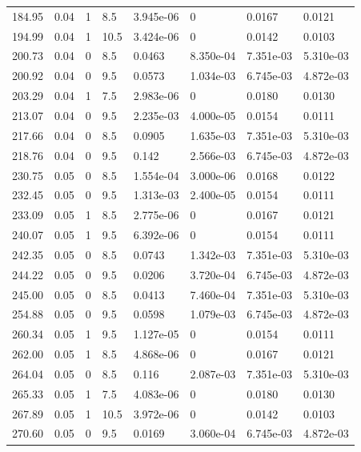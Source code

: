 \documentclass[preview]{standalone}
\begin{document}
{{{\begin{tabular}{L{1.2cm}C{1.2cm} C{0.3cm}C{0.5cm} C{1.4cm}C{1.4cm} C{1.4cm}C{1.4cm}}
  184.95  &  0.04  & 1     & 8.5 &  3.945e-06  & 0  & 0.0167 &  0.0121   \\ 
  194.99  &  0.04  & 1     & 10.5 &  3.424e-06  & 0  & 0.0142 &  0.0103   \\ 
  200.73  &  0.04  & 0     & 8.5 &  0.0463  & 8.350e-04  & 7.351e-03 &  5.310e-03   \\ 
  200.92  &  0.04  & 0     & 9.5 &  0.0573  & 1.034e-03  & 6.745e-03 &  4.872e-03   \\ 
  203.29  &  0.04  & 1     & 7.5 &  2.983e-06  & 0  & 0.0180 &  0.0130   \\ 
  213.07  &  0.04  & 0     & 9.5 &  2.235e-03  & 4.000e-05  & 0.0154 &  0.0111   \\ 
  217.66  &  0.04  & 0     & 8.5 &  0.0905  & 1.635e-03  & 7.351e-03 &  5.310e-03   \\ 
  218.76  &  0.04  & 0     & 9.5 &  0.142  & 2.566e-03  & 6.745e-03 &  4.872e-03   \\ 
  230.75  &  0.05  & 0     & 8.5 &  1.554e-04  & 3.000e-06  & 0.0168 &  0.0122   \\ 
  232.45  &  0.05  & 0     & 9.5 &  1.313e-03  & 2.400e-05  & 0.0154 &  0.0111   \\ 
  233.09  &  0.05  & 1     & 8.5 &  2.775e-06  & 0  & 0.0167 &  0.0121   \\ 
  240.07  &  0.05  & 1     & 9.5 &  6.392e-06  & 0  & 0.0154 &  0.0111   \\ 
  242.35  &  0.05  & 0     & 8.5 &  0.0743  & 1.342e-03  & 7.351e-03 &  5.310e-03   \\ 
  244.22  &  0.05  & 0     & 9.5 &  0.0206  & 3.720e-04  & 6.745e-03 &  4.872e-03   \\ 
  245.00  &  0.05  & 0     & 8.5 &  0.0413  & 7.460e-04  & 7.351e-03 &  5.310e-03   \\ 
  254.88  &  0.05  & 0     & 9.5 &  0.0598  & 1.079e-03  & 6.745e-03 &  4.872e-03   \\ 
  260.34  &  0.05  & 1     & 9.5 &  1.127e-05  & 0  & 0.0154 &  0.0111   \\ 
  262.00  &  0.05  & 1     & 8.5 &  4.868e-06  & 0  & 0.0167 &  0.0121   \\ 
  264.04  &  0.05  & 0     & 8.5 &  0.116  & 2.087e-03  & 7.351e-03 &  5.310e-03   \\ 
  265.33  &  0.05  & 1     & 7.5 &  4.083e-06  & 0  & 0.0180 &  0.0130   \\ 
  267.89  &  0.05  & 1     & 10.5 &  3.972e-06  & 0  & 0.0142 &  0.0103   \\ 
  270.60  &  0.05  & 0     & 9.5 &  0.0169  & 3.060e-04  & 6.745e-03 &  4.872e-03   \\ 

\end{tabular}}}}
\end{document}
